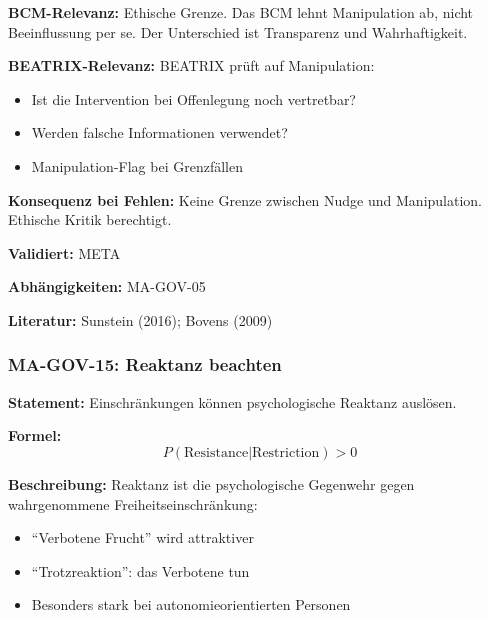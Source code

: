 \textbf{BCM-Relevanz:}
Ethische Grenze. Das BCM lehnt Manipulation ab, nicht Beeinflussung per se. Der Unterschied ist Transparenz und Wahrhaftigkeit.

\textbf{BEATRIX-Relevanz:}
BEATRIX prüft auf Manipulation:
\begin{itemize}
    \item Ist die Intervention bei Offenlegung noch vertretbar?
    \item Werden falsche Informationen verwendet?
    \item Manipulation-Flag bei Grenzfällen
\end{itemize}

\textbf{Konsequenz bei Fehlen:}
Keine Grenze zwischen Nudge und Manipulation. Ethische Kritik berechtigt.

\textbf{Validiert:} META

\textbf{Abhängigkeiten:} MA-GOV-05

\textbf{Literatur:} Sunstein (2016); Bovens (2009)



\subsubsection*{MA-GOV-15: Reaktanz beachten}

\textbf{Statement:} Einschränkungen können psychologische Reaktanz auslösen.

\textbf{Formel:}
\begin{equation}
P(\text{Resistance}|\text{Restriction}) > 0
\end{equation}

\textbf{Beschreibung:}
Reaktanz ist die psychologische Gegenwehr gegen wahrgenommene Freiheitseinschränkung:
\begin{itemize}
    \item ``Verbotene Frucht'' wird attraktiver
    \item ``Trotzreaktion'': das Verbotene tun
    \item Besonders stark bei autonomieorientierten Personen
\end{itemize}


